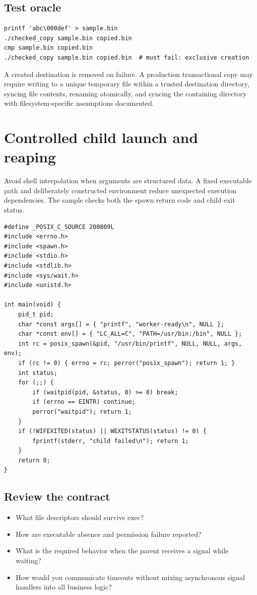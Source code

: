 \documentclass[11pt,letterpaper,oneside]{report}
\begin{document}
\section{Test oracle}
\begin{lstlisting}
printf 'abc\000def' > sample.bin
./checked_copy sample.bin copied.bin
cmp sample.bin copied.bin
./checked_copy sample.bin copied.bin  # must fail: exclusive creation
\end{lstlisting}
\begin{engineeringnote}
A created destination is removed on failure. A production transactional copy may require writing to a unique temporary file within a trusted destination directory, syncing file contents, renaming atomically, and syncing the containing directory with filesystem-specific assumptions documented.
\end{engineeringnote}
\chapter{Controlled child launch and reaping}
Avoid shell interpolation when arguments are structured data. A fixed executable path and deliberately constructed environment reduce unexpected execution dependencies. The sample checks both the spawn return code and child exit status.

\begin{lstlisting}
#define _POSIX_C_SOURCE 200809L
#include <errno.h>
#include <spawn.h>
#include <stdio.h>
#include <stdlib.h>
#include <sys/wait.h>
#include <unistd.h>

int main(void) {
    pid_t pid;
    char *const args[] = { "printf", "worker-ready\n", NULL };
    char *const env[] = { "LC_ALL=C", "PATH=/usr/bin:/bin", NULL };
    int rc = posix_spawn(&pid, "/usr/bin/printf", NULL, NULL, args, env);
    if (rc != 0) { errno = rc; perror("posix_spawn"); return 1; }
    int status;
    for (;;) {
        if (waitpid(pid, &status, 0) >= 0) break;
        if (errno == EINTR) continue;
        perror("waitpid"); return 1;
    }
    if (!WIFEXITED(status) || WEXITSTATUS(status) != 0) {
        fprintf(stderr, "child failed\n"); return 1;
    }
    return 0;
}
\end{lstlisting}
\section{Review the contract}
\begin{itemize}
\item What file descriptors should survive exec?
\item How are executable absence and permission failure reported?
\item What is the required behavior when the parent receives a signal while waiting?
\item How would you communicate timeouts without mixing asynchronous signal handlers into all business logic?
\end{itemize}
\end{document}
